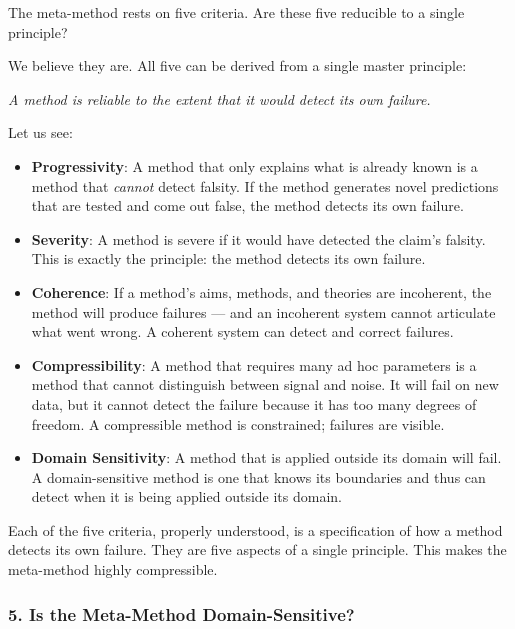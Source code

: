 \documentclass[11pt,letterpaper]{article}
\begin{document}
The meta-method rests on five criteria. Are these five reducible to a single principle?

We believe they are. All five can be derived from a single master principle:

\begin{center}
\textit{A method is reliable to the extent that it would detect its own failure.}
\end{center}

Let us see:

\begin{itemize}
  \item \textbf{Progressivity}: A method that only explains what is already known is a method that \emph{cannot} detect falsity. If the method generates novel predictions that are tested and come out false, the method detects its own failure.

  \item \textbf{Severity}: A method is severe if it would have detected the claim's falsity. This is exactly the principle: the method detects its own failure.

  \item \textbf{Coherence}: If a method's aims, methods, and theories are incoherent, the method will produce failures — and an incoherent system cannot articulate what went wrong. A coherent system can detect and correct failures.

  \item \textbf{Compressibility}: A method that requires many ad hoc parameters is a method that cannot distinguish between signal and noise. It will fail on new data, but it cannot detect the failure because it has too many degrees of freedom. A compressible method is constrained; failures are visible.

  \item \textbf{Domain Sensitivity}: A method that is applied outside its domain will fail. A domain-sensitive method is one that knows its boundaries and thus can detect when it is being applied outside its domain.
\end{itemize}

Each of the five criteria, properly understood, is a specification of how a method detects its own failure. They are five aspects of a single principle. This makes the meta-method highly compressible.

\subsubsection*{5. Is the Meta-Method Domain-Sensitive?}
\end{document}
